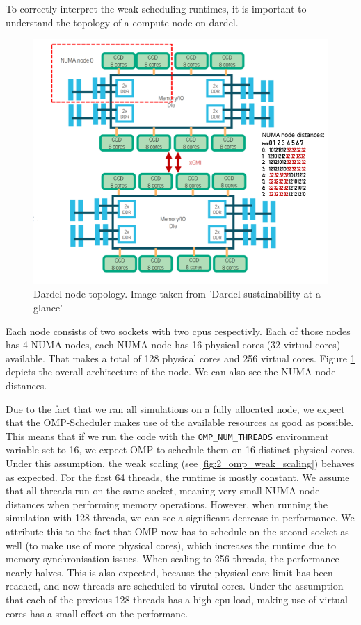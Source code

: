 \documentclass[a4paper,10pt]{article}
\begin{document}
To correctly interpret the weak scheduling runtimes, it is important to understand the topology of a compute node on dardel.
\begin{figure}
     \centering
     \includegraphics[width=\textwidth]{../images/2_openmp/node_topology.png}
     \caption{Dardel node topology. Image taken from 'Dardel sustainability at a glance'\cite{Barth2023}}
     \label{fig:dardel_topo}
\end{figure}
Each node consists of two sockets with two cpus respectivly.
Each of those nodes has 4 NUMA nodes, each NUMA node has 16 physical cores (32 virtual cores) available.
That makes a total of 128 physical cores and 256 virtual cores.
Figure \ref{fig:dardel_topo} depicts the overall architecture of the node.
We can also see the NUMA node distances.

Due to the fact that we ran all simulations on a fully allocated node, we expect that the OMP-Scheduler makes use of the available resources as good as possible.
This means that if we run the code with the \verb|OMP_NUM_THREADS| environment variable set to 16, we expect OMP to schedule them on 16 distinct physical cores.
Under this assumption, the weak scaling (see \ref{fig:2_omp_weak_scaling}) behaves as expected.
For the first 64 threads, the runtime is mostly constant.
We assume that all threads run on the same socket, meaning very small NUMA node distances when performing memory operations.
However, when running the simulation with 128 threads, we can see a significant decrease in performance.
We attribute this to the fact that OMP now has to schedule on the second socket as well (to make use of more physical cores), which increases the runtime due to memory synchronisation issues.
When scaling to 256 threads, the performance nearly halves.
This is also expected, because the physical core limit has been reached, and now threads are scheduled to virutal cores.
Under the assumption that each of the previous 128 threads has a high cpu load, making use of virtual cores has a small effect on the performane.
\end{document}
